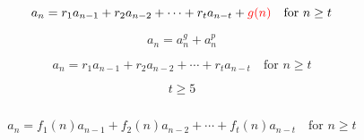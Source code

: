 \begin{frame}{}
  \centerline{}
\end{frame}

\begin{frame}{}
  \[
    a_n = r_1 a_{n-1} + r_2 a_{n-2} + \cdots + r_t a_{n-t} + \textcolor{red}{g(n)} \quad \text{for } n \ge t
  \]

  \pause
  \vspace{0.50cm}
  \[
    a_n = a_n^{g} + a_n^{p}
  \]
  \centerline{\href{http://mysite.science.uottawa.ca/msajna/MAT2348/non-hom-RR.pdf}
  {}}
\end{frame}

\begin{frame}{}
  \[
    a_n = r_1 a_{n-1} + r_2 a_{n-2} + \cdots + r_t a_{n-t} \quad \text{for } n \ge t
  \]

  \[
    t \ge 5
  \]

  \pause
  \begin{columns}
  \end{columns}

  \pause
  \vspace{0.50cm}
  \centerline{}
\end{frame}

\begin{frame}{}
  \[
    a_n = f_1(n) a_{n-1} + f_2(n) a_{n-2} + \cdots + f_t(n) a_{n-t} \quad \text{for } n \ge t
  \]

  \pause
  \vspace{0.80cm}
  \centerline{}
\end{frame}

\begin{frame}{}
\end{frame}
